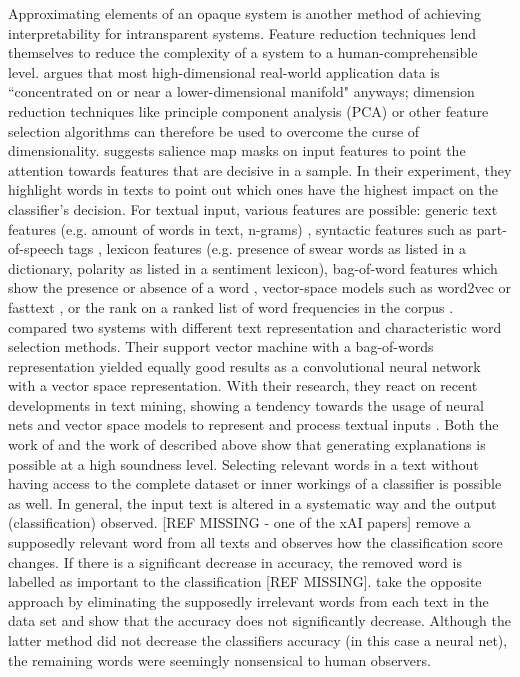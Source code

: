 Approximating elements of an opaque system is another method of achieving interpretability for intransparent systems. Feature reduction techniques lend themselves to reduce the complexity of a system to a human-comprehensible level. \cite{domingos2012few} argues that most high-dimensional real-world application data is ``concentrated on or near a lower-dimensional manifold" anyways; dimension reduction techniques like principle component analysis (PCA) or other feature selection algorithms can therefore be used to overcome the curse of dimensionality. \cite{chen2018learning} suggests salience map masks on input features to point the attention towards features that are decisive in a sample. In their experiment, they highlight words in texts to point out which ones have the highest impact on the classifier's decision. For textual input, various features are possible: generic text features (e.g. amount of words in text, n-grams) \cite{del2017hate}, syntactic features such as part-of-speech tags \cite{del2017hate}, lexicon features (e.g. presence of swear words as listed in a dictionary, polarity as listed in a sentiment lexicon), bag-of-word features which show the presence or absence of a word \cite{arras2017relevant}, vector-space models such as word2vec or fasttext \cite{arras2017relevant, hovelmann2017fasttext}, or the rank on a ranked list of word frequencies in the corpus \cite{chen2018learning}. \cite{arras2017relevant} compared two systems with different text representation and characteristic word selection methods. Their support vector machine with a bag-of-words representation yielded equally good results as a convolutional neural network with a vector space representation. With their research, they react on recent developments in text mining, showing a tendency towards the usage of neural nets and vector space models to represent and process textual inputs \cite{arras2017relevant}. Both the work of \cite{arras2017relevant} and the work of \cite{chen2018learning} described above show that generating explanations is possible at a high soundness level. Selecting relevant words in a text without having access to the complete dataset or inner workings of a classifier is possible as well. In general, the input text is altered in a systematic way and the output (classification) observed. {\color{red}[REF MISSING - one of the xAI papers]} remove a supposedly relevant word from all texts and observes how the classification score changes. If there is a significant decrease in accuracy, the removed word is labelled as important to the classification {\color{red}[REF MISSING]}. \cite{feng2018pathologies} take the opposite approach by eliminating the supposedly irrelevant words from each text in the data set and show that the accuracy does not significantly decrease. Although the latter method did not decrease the classifiers accuracy (in this case a neural net), the remaining words were seemingly nonsensical to human observers.\newline
